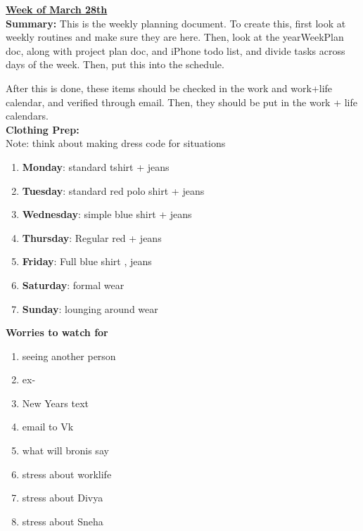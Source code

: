 

{\huge{\underline{\textbf{Week of March 28th}}}} \\

\textbf{Summary:} This is the weekly planning document. To create
this, first look at weekly routines and make sure they are here. Then,
look at the yearWeekPlan doc, along with project plan doc, and iPhone
todo list, and divide tasks across days of the week. Then, put this
into the schedule.

After this is done, these items should be checked in the work and
work+life calendar, and verified through email.
Then, they should be put in the work + life
calendars. \\

\textbf{Clothing Prep: } \\
Note: think about making dress code for situations
\begin{enumerate}
\item \textbf{Monday}: standard tshirt + jeans
\item \textbf{Tuesday}: standard red polo shirt + jeans
\item \textbf{Wednesday}: simple  blue shirt + jeans
\item \textbf{Thursday}: Regular red + jeans
\item \textbf{Friday}: Full blue shirt , jeans
\item \textbf{Saturday}: formal wear
\item \textbf{Sunday}: lounging around wear
\end{enumerate}

\textbf{Worries to watch for} \\
\begin{enumerate}
\item seeing another person
\item ex-
\item New Years text
\item email to Vk
\item what will bronis say
\item stress about worklife
\item stress about Divya
\item stress about Sneha
\end{enumerate}

